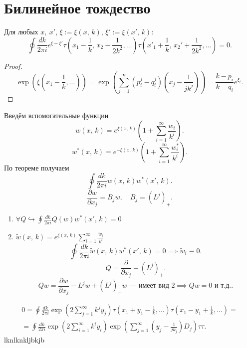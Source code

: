 \documentclass[a4paper]{article}
\begin{document}
\section*{Билинейное тождество}
\begin{thm}
	Для любых $x,\ x'$, $\xi:= \xi (x,\,k)$, $\xi' := \xi (x',\,k)$:
	\[
		\oint \frac{dk}{2\pi i} e^{\xi-\xi'}\tau \left( 
		x_1- \frac{1}{k},\, x_2 - \frac{1}{2k^2},\ldots\right) \tau \left( x'_1 + \frac{1}{k},\,x_2' + \frac{1}{2k^2},\ldots \right) =0
	.\] 
\end{thm}
\begin{proof}
\[
	\exp \left(  \xi \left( x_1 - \frac{1}{k},\ldots \right)  \right) = \exp \left( \sum_{j=1}^{\infty} \left( p_i ^j -q_i^j \right) 
	\left( x_j - \frac{1}{j k^j} \right) \right) =
	\frac{k-p_i}{k-q_i}e^{\xi_i}
.\] 
\end{proof}
Введём вспомогательные функции
\[
	w(x,\,k)= e^{\xi (x,\,k)}\left( 1+ \sum_{i=1}^{\infty} \frac{w_i}{k^i} \right) 
.\] 
 \[
	w^*(x,\,k)= e^{-\xi (x,\,k)}\left( 1+ \sum_{i=1}^{\infty} \frac{w^*_i}{k^i} \right) 
.\]
По теореме получаем
\[
	\oint \frac{dk}{2\pi i} w (x,\,k) w^* (x',\,k)
.\] 
\[
	\frac{\partial w}{\partial x_j} =B_j w,\quad B_j =\left( L^j \right) _{+}
.\] 
\begin{enumerate}
\item $\displaystyle  \forall Q \hookrightarrow \oint
	\frac{dk}{2\pi i} Q(w) w^*(x',\,k)=0$
\item $\displaystyle \tilde{w} (x,\,k)= e^{\xi (x,\,k)} \sum_{i=1}^{\infty} \frac{\tilde{w}_i}{k^i}$ 
	\[
		\oint \frac{dk}{ 2\pi i} \tilde{w} (x,\,k) w^*(x',\,k)=0 \implies \tilde{w}_i \equiv 0
	.\] 
	\[
		Q= \frac{\partial }{\partial x_j} - (L^j)_+
	.\] 
	\[
		Qw= \frac{\partial w}{\partial x_j}- L^j w + (L^j)_-
		w \text{  --- имеет вид 2}\implies Qw=0 \text{ и т.д.}
	.\] 
\end{enumerate}
\begin{multline*}
	0 = \oint \frac{dk}{2\pi i } \exp \left( 
	2 \sum_{j=1}^{\infty} k^j y_j\right) \tau
	\left( x_1+ y_1 - \frac{1}{k},\ldots \right) \tau\left( 
	x_1- y_1+ \frac{1}{k},\ldots\right) =\\=
	\oint \frac{dk}{2\pi i} \exp \left( 2 \sum_{i=1}^{\infty} k^i
	y_i\right) \exp \left( \sum_{j=1}^{\infty} \left( y_j- \frac{1}{j k_j} \right) D_j \right) \tau\tau
.\end{multline*} 
lknlknkljbkjb
\end{document}
